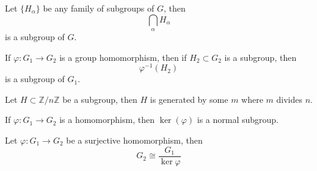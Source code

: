 \documentclass[openany]{book}
\newcommand{\Z}{\mathbb{Z}}
\begin{document}

\begin{prop}
    Let $\{H_\alpha\}$ be any family of subgroups of $G$, then 
    \begin{equation*}
        \bigcap_\alpha H_\alpha
    \end{equation*}
    is a subgroup of $G$.
\end{prop}

\begin{prop}
    If $\varphi: G_1\to G_2$ is a group homomorphism, then if $H_2\subset G_2$ is a subgroup, then 
    \begin{equation*}
        \varphi^{-1}(H_2)
    \end{equation*}
    is a subgroup of $G_1$.
\end{prop}

\begin{prop}
    Let $H\subset\Z/n\Z$ be a subgroup, then $H$ is generated by some $m$ where $m$ divides $n$.
\end{prop}


\begin{prop}
    If $\varphi: G_1\to G_2$ is a homomorphism, then $\ker(\varphi)$ is a normal subgroup.
\end{prop}


\begin{thm}
    Let $\varphi:G_1\to G_2$ be a surjective homomorphism, then 
    \begin{equation*}
        G_2\cong\frac{G_1}{\ker\varphi}
    \end{equation*}
\end{thm}
\end{document}
